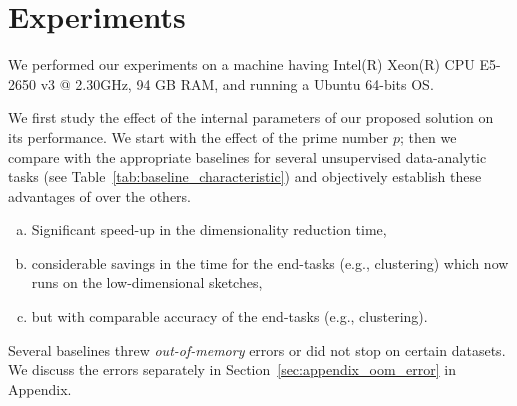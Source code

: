 \section{Experiments}\label{sec:experiments}

We performed our experiments on a machine having {Intel(R) Xeon(R) CPU E5-2650 v3 @ 2.30GHz, 94 GB RAM, and running a Ubuntu 64-bits OS.}


We first study the effect of the internal parameters of our proposed solution on its performance. We start with the effect of the prime number $p$; then we compare \fsketch with the appropriate baselines for several unsupervised data-analytic tasks (see Table~\ref{tab:baseline_characteristic}) and objectively establish these advantages of \fsketch over the others.

\begin{enumerate}[(a)]
    \item Significant speed-up in the dimensionality reduction time,
    \item considerable savings in the time for the end-tasks (e.g., clustering) which now runs on the low-dimensional sketches,%
    \item but with comparable accuracy of the end-tasks (e.g., clustering).
\end{enumerate}

Several baselines threw {\it out-of-memory} errors or did not stop on certain datasets. We discuss the errors separately in Section~\ref{sec:appendix_oom_error} in Appendix.

